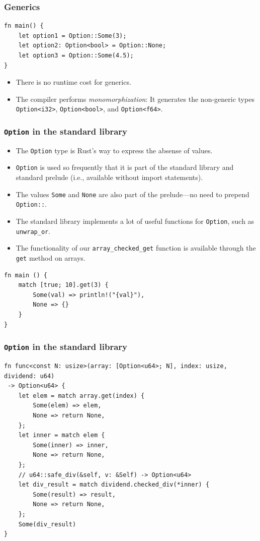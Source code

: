 \begin{frame}[fragile]
    \frametitle{Generics}
    \begin{verbatim}
fn main() {
    let option1 = Option::Some(3);
    let option2: Option<bool> = Option::None;
    let option3 = Option::Some(4.5);
}
    \end{verbatim}
    \pause
    \vfill
    \begin{itemize}
        \item There is no runtime cost for generics.
        \item The compiler performs \textit{monomorphization}: It generates the non-generic types \texttt{Option<i32>}, \texttt{Option<bool>}, and \texttt{Option<f64>}.
    \end{itemize}
\end{frame}

\begin{frame}[fragile]
    \frametitle{\texttt{Option} in the standard library}
    \begin{itemize}
        \item The \texttt{Option} type is Rust's way to express the absense of values.
        \pause
        \item \texttt{Option} is used so frequently that it is part of the standard library and standard prelude (i.e., available without import statements).
        \item The values \texttt{Some} and \texttt{None} are also part of the prelude---no need to prepend \texttt{Option::}.
        \item The standard library implements a lot of useful functions for \texttt{Option}, such as \texttt{unwrap\_or}.
        \pause
        \vspace{.3cm}
        \item The functionality of our \texttt{array\_checked\_get} function is available through the \texttt{get} method on arrays.
    \end{itemize}
    \pause
    \vfill
    \begin{verbatim}
fn main () {
    match [true; 10].get(3) {
        Some(val) => println!("{val}"),
        None => {}
    }
}
    \end{verbatim}
\end{frame}

\begin{frame}[fragile]
    \frametitle{\texttt{Option} in the standard library}
    \begin{verbatim}
fn func<const N: usize>(array: [Option<u64>; N], index: usize, dividend: u64)
 -> Option<u64> {
    let elem = match array.get(index) {
        Some(elem) => elem,
        None => return None,
    };
    let inner = match elem {
        Some(inner) => inner,
        None => return None,
    };
    // u64::safe_div(&self, v: &Self) -> Option<u64>
    let div_result = match dividend.checked_div(*inner) {
        Some(result) => result,
        None => return None,
    };
    Some(div_result)
}
    \end{verbatim}
\end{frame}

